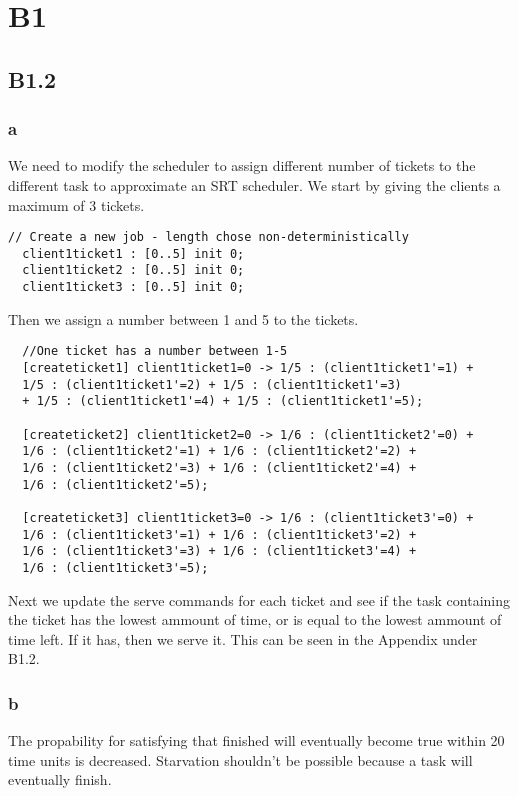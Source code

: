 
\section{B1}

\subsection{B1.2}

\subsubsection{a}

We need to modify the scheduler to assign different number of tickets to the different task to approximate an SRT scheduler.
We start by giving the clients a maximum of 3 tickets.
\begin{verbatim}
// Create a new job - length chose non-deterministically
  client1ticket1 : [0..5] init 0;
  client1ticket2 : [0..5] init 0;
  client1ticket3 : [0..5] init 0;
\end{verbatim}
Then we assign a number between 1 and 5 to the tickets.
\begin{verbatim}
  //One ticket has a number between 1-5
  [createticket1] client1ticket1=0 -> 1/5 : (client1ticket1'=1) + 
  1/5 : (client1ticket1'=2) + 1/5 : (client1ticket1'=3) 
  + 1/5 : (client1ticket1'=4) + 1/5 : (client1ticket1'=5);

  [createticket2] client1ticket2=0 -> 1/6 : (client1ticket2'=0) + 
  1/6 : (client1ticket2'=1) + 1/6 : (client1ticket2'=2) + 
  1/6 : (client1ticket2'=3) + 1/6 : (client1ticket2'=4) + 
  1/6 : (client1ticket2'=5);

  [createticket3] client1ticket3=0 -> 1/6 : (client1ticket3'=0) + 
  1/6 : (client1ticket3'=1) + 1/6 : (client1ticket3'=2) + 
  1/6 : (client1ticket3'=3) + 1/6 : (client1ticket3'=4) + 
  1/6 : (client1ticket3'=5);
\end{verbatim}
Next we update the serve commands for each ticket and see if the task containing the ticket has the lowest ammount of time, or is equal to the lowest ammount of time left. If it has, then we serve it.
This can be seen in the Appendix under B1.2.

\subsubsection{b}

The propability for satisfying that finished will eventually become true within 20 time units is decreased. Starvation shouldn't be possible because a task will eventually finish.

